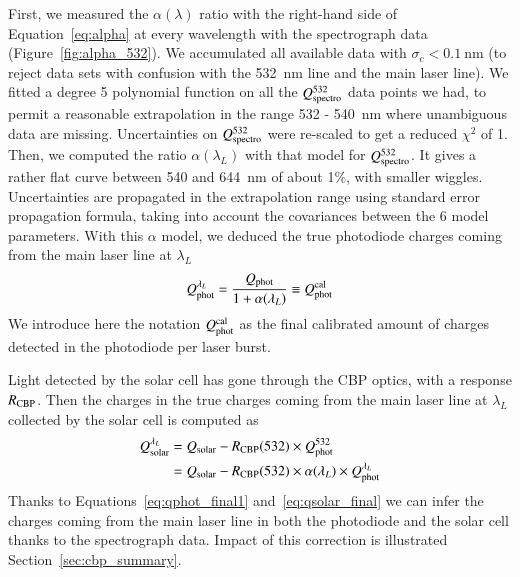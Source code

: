 First, we measured the $\alpha(\lambda)$ ratio with the right-hand side of Equation~\ref{eq:alpha} at every wavelength with the spectrograph data (Figure~\ref{fig:alpha_532}). We accumulated all available data with $\sigma_c < \SI{0.1}{\nm}$ (to reject data sets with confusion with the \SI{532}{\nm} line and the main laser line). We fitted a degree 5 polynomial function on all the $Q_{\mathrm{spectro}}^{532}$ data points we had, to permit a reasonable extrapolation in the range 532 - \SI{540}{\nm} where unambiguous data are missing. Uncertainties on  $Q_{\mathrm{spectro}}^{532}$ were re-scaled to get a reduced $\chi^2$ of 1. Then, we computed the ratio $\alpha(\lambda_L)$ with that model for $Q_{\mathrm{spectro}}^{532}$. It gives a rather flat curve between 540 and \SI{644}{\nm} of about 1\%, with smaller wiggles. Uncertainties are propagated in the extrapolation range using standard error propagation formula, taking into account the covariances between the 6 model parameters. With this $\alpha$ model, we deduced the true photodiode charges coming from the main laser line at $\lambda_L$
\begin{equation}
        Q_{\mathrm{phot}}^{\lambda_L} =  \frac{Q_{\mathrm{phot}}}{1 + \alpha(\lambda_L)} \equiv Q_{\mathrm{phot}}^{\rm cal}
        \label{eq:qphot_final1}
\end{equation}
We introduce here the notation $Q_{\mathrm{phot}}^{\rm cal}$ as the final calibrated amount of charges detected in the photodiode per laser burst. 

Light detected by the solar cell has gone through the CBP optics, with a response $R_{\mathrm{CBP}}$.
Then the charges in the true charges coming from the main laser line at $\lambda_L$ collected by the solar cell is computed as
\begin{equation}
\begin{aligned}
    Q_{\mathrm{solar}}^{\lambda_L} & = Q_{\mathrm{solar}} - R_{\mathrm{CBP}}(532) \times Q_{\mathrm{phot}}^{532} \\ 
    & = Q_{\mathrm{solar}} - R_{\mathrm{CBP}}(532) \times \alpha(\lambda_L) \times Q_{\mathrm{phot}}^{\lambda_L}
    \label{eq:qsolar_final}
\end{aligned}
\end{equation}
Thanks to Equations~\ref{eq:qphot_final1} and~\ref{eq:qsolar_final} we can infer the charges coming from the main laser line in both the photodiode and the solar cell thanks to the spectrograph data. Impact of this correction is illustrated Section~\ref{sec:cbp_summary}.


